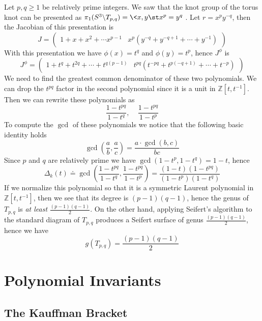 \begin{example}
Let $p,q \geq 1$ be relatively prime integers. We saw that the knot group of the torus knot can be presented as $\pi_1(S^3 \backslash T_{p,q}) = \< x,y \st x^p=y^q \>$. Let $r=x^py^{-q}$, then the Jacobian of this presentation is
\[ J = \begin{pmatrix} 1+x+x^2 + \cdots x^{p-1} & x^p(y^{-q}+y^{-q+1}+\cdots+y^{-1}) \end{pmatrix} \]
With this presentation we have $\phi(x)=t^q$ and $\phi(y)=t^p$, hence $J^\phi$ is
\[ J^\phi = \begin{pmatrix} 1+t^q+t^{2q}+\cdots+t^{q(p-1)} & t^{pq}(t^{-pq}+t^{p(-q+1)}+\cdots+t^{-p}) \end{pmatrix} \]
We need to find the greatest common denominator of these two polynomials. We can drop the $t^{pq}$ factor in the second polynomial since it is a unit in $\mathbb Z[t,t^{-1}]$. Then we can rewrite these polynomials as
\[ \frac{1-t^{pq}}{1-t^q}, \ \ \ \ \ \frac{1-t^{pq}}{1-t^p} \]
To compute the $\gcd$ of these polynomials we notice that the following basic identity holds
\[ \gcd\left( \frac{a}{b},\frac{a}{c} \right) = \frac{a \cdot \gcd(b,c)}{bc} \]
Since $p$ and $q$ are relatively prime we have $\gcd(1-t^p,1-t^q)=1-t$, hence
\[ \Delta_k(t) \dotequal \gcd\left(\frac{1-t^{pq}}{1-t^q},\frac{1-t^{pq}}{1-t^p}\right) = \frac{(1-t)(1-t^{pq})}{(1-t^p)(1-t^q)} \]
If we normalize this polynomial so that it is a symmetric Laurent polynomial in $\mathbb Z[t,t^{-1}]$, then we see that its degree is $(p-1)(q-1)$, hence the genus of $T_{p,q}$ is \emph{at least} $\frac{(p-1)(q-1)}{2}$. On the other hand, applying Seifert's algorithm to the standard diagram of $T_{p,q}$ produces a Seifert surface of genus $\frac{(p-1)(q-1)}{2}$, hence we have
\[ g(T_{p,q}) = \frac{(p-1)(q-1)}{2} \]
\end{example}















\newpage
\section{Polynomial Invariants}
\label{Polynomial Invariants}



\subsection{The Kauffman Bracket}
\label{The Kauffman Bracket}




